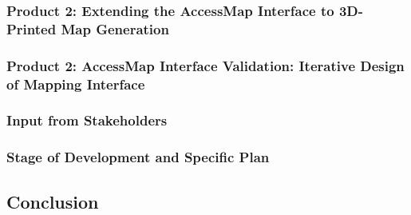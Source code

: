 %


%

\subsubsection{Product 2: Extending the AccessMap Interface to 3D-Printed
Map Generation}
\label{sec:accessmap-extension}



\subsubsection{Product 2: AccessMap Interface Validation: Iterative Design of Mapping Interface}
\label{sec:accessmap-studies}


\subsubsection{Input from Stakeholders}
\label{sec:stakeholder-input}


\subsubsection{Stage of Development and Specific Plan}
\label{sec:stage}
    



\subsection{Conclusion}

